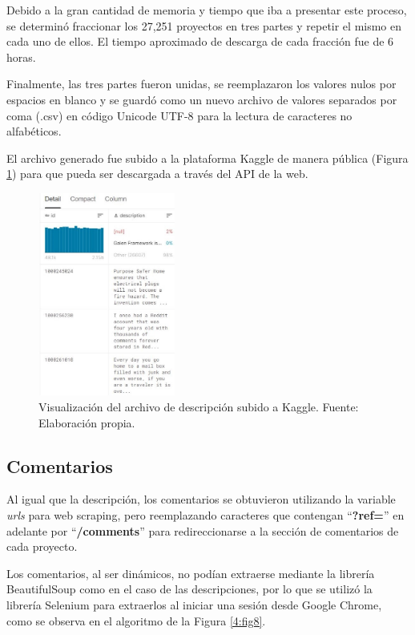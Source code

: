 Debido a la gran cantidad de memoria y tiempo que iba a presentar este proceso, se determinó fraccionar los 27,251 proyectos en tres partes y repetir el mismo en cada uno de ellos. El tiempo aproximado de descarga de cada fracción fue de 6 horas.

Finalmente, las tres partes fueron unidas, se reemplazaron los valores nulos por espacios en blanco y se guardó como un nuevo archivo de valores separados por coma (.csv) en código Unicode UTF-8 para la lectura de caracteres no alfabéticos.

El archivo generado fue subido a la plataforma Kaggle de manera pública (Figura \ref{4:fig7}) para que pueda ser descargada a través del API de la web.

\begin{figure}[!ht]
	\begin{center}
		\includegraphics[width=0.4\textwidth]{4/figures/description_kaggle_preview.jpg}
		\caption{Visualización del archivo de descripción subido a Kaggle. Fuente: Elaboración propia.}
		\label{4:fig7}
	\end{center}
\end{figure}

\subsection{Comentarios}
Al igual que la descripción, los comentarios se obtuvieron utilizando la variable \textit{urls} para web scraping, pero reemplazando caracteres que contengan “\textbf{?ref=}” en adelante por “\textbf{/comments}” para redireccionarse a la sección de comentarios de cada proyecto.

Los comentarios, al ser dinámicos, no podían extraerse mediante la librería BeautifulSoup como en el caso de las descripciones, por lo que se utilizó la librería Selenium para extraerlos al iniciar una sesión desde Google Chrome, como se observa en el algoritmo de la Figura \ref{4:fig8}.

